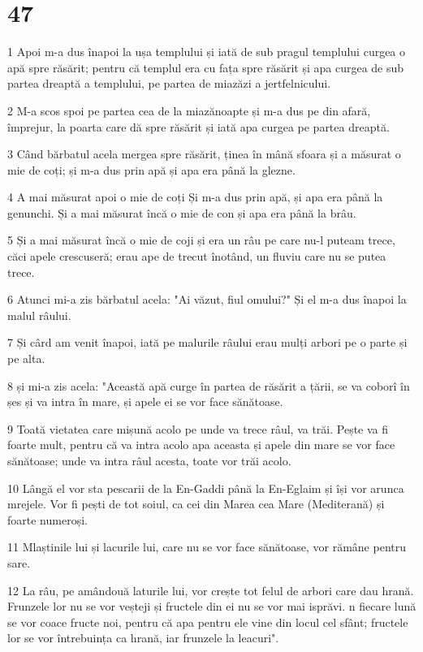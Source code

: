\chapter{47}

\par 1 Apoi m-a dus înapoi la ușa templului și iată de sub pragul templului curgea o apă spre răsărit; pentru că templul era cu fața spre răsărit și apa curgea de sub partea dreaptă a templului, pe partea de miazăzi a jertfelnicului.
\par 2 M-a scos spoi pe partea cea de la miazănoapte și m-a dus pe din afară, împrejur, la poarta care dă spre răsărit și iată apa curgea pe partea dreaptă.
\par 3 Când bărbatul acela mergea spre răsărit, ținea în mână sfoara și a măsurat o mie de coți; și m-a dus prin apă și apa era până la glezne.
\par 4 A mai măsurat apoi o mie de coți Și m-a dus prin apă, și apa era până la genunchi. Și a mai măsurat încă o mie de con și apa era până la brâu.
\par 5 Și a mai măsurat încă o mie de coji și era un râu pe care nu-l puteam trece, căci apele crescuseră; erau ape de trecut înotând, un fluviu care nu se putea trece.
\par 6 Atunci mi-a zis bărbatul acela: "Ai văzut, fiul omului?" Și el m-a dus înapoi la malul râului.
\par 7 Și cârd am venit înapoi, iată pe malurile râului erau mulți arbori pe o parte și pe alta.
\par 8 și mi-a zis acela: "Această apă curge în partea de răsărit a țării, se va coborî în șes și va intra în mare, și apele ei se vor face sănătoase.
\par 9 Toată vietatea care mișună acolo pe unde va trece râul, va trăi. Pește va fi foarte mult, pentru că va intra acolo apa aceasta și apele din mare se vor face sănătoase; unde va intra râul acesta, toate vor trăi acolo.
\par 10 Lângă el vor sta pescarii de la En-Gaddi până la En-Eglaim și își vor arunca mrejele. Vor fi pești de tot soiul, ca cei din Marea cea Mare (Mediterană) și foarte numeroși.
\par 11 Mlaștinile lui și lacurile lui, care nu se vor face sănătoase, vor rămâne pentru sare.
\par 12 La râu, pe amândouă laturile lui, vor crește tot felul de arbori care dau hrană. Frunzele lor nu se vor veșteji și fructele din ei nu se vor mai isprăvi. n fiecare lună se vor coace fructe noi, pentru că apa pentru ele vine din locul cel sfânt; fructele lor se vor întrebuința ca hrană, iar frunzele la leacuri".
